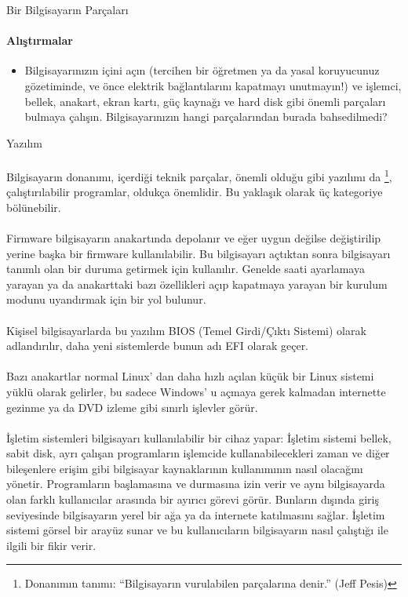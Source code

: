 \documentclass[10pt,a5paper]{book}
\begin{document}
\begin{section}{Bir Bilgisayarın Parçaları}
\paragraph{Alıştırmalar}{}
\begin{itemize}
 \item Bilgisayarınızın içini açın (tercihen bir öğretmen ya da yasal koruyucunuz gözetiminde, ve önce elektrik bağlantılarını kapatmayı unutmayın!) ve işlemci, bellek, anakart, ekran kartı, güç kaynağı ve hard disk gibi önemli parçaları bulmaya çalışın. Bilgisayarınızın hangi parçalarından burada bahsedilmedi?
\end{itemize}
\end{section}

\begin{section}{Yazılım}
\paragraph{}{Bilgisayarın donanımı, içerdiği teknik parçalar, önemli olduğu gibi yazılımı da
\footnote{Donanımın tanımı: “Bilgisayarın vurulabilen parçalarına denir.” (Jeff Pesis)}, çalıştırılabilir programlar, oldukça önemlidir. Bu yaklaşık olarak üç kategoriye bölünebilir.}
\paragraph{}{Firmware bilgisayarın anakartında depolanır ve eğer uygun değilse değiştirilip yerine başka bir firmware kullanılabilir. Bu bilgisayarı açtıktan sonra bilgisayarı tanımlı olan bir duruma getirmek için kullanılır. Genelde saati ayarlamaya yarayan ya da anakarttaki bazı özellikleri açıp kapatmaya yarayan bir kurulum modunu uyandırmak için bir yol bulunur.}
\paragraph{}{Kişisel bilgisayarlarda bu yazılım BIOS (Temel Girdi/Çıktı Sistemi) olarak adlandırılır, daha yeni sistemlerde bunun adı EFI olarak geçer.}
\paragraph{}{Bazı anakartlar normal Linux' dan daha hızlı açılan küçük bir Linux sistemi yüklü olarak gelirler, bu sadece Windows' u açmaya gerek kalmadan internette gezinme ya da DVD izleme gibi sınırlı işlevler görür.}
\paragraph{}{İşletim sistemleri bilgisayarı kullanılabilir bir cihaz yapar: İşletim sistemi bellek, sabit disk, ayrı çalışan programların işlemcide kullanabilecekleri zaman ve diğer bileşenlere erişim gibi bilgisayar kaynaklarının kullanımının nasıl olacağını yönetir. Programların başlamasına ve durmasına izin verir ve aynı bilgisayarda olan farklı kullanıcılar arasında bir ayırıcı görevi görür. Bunların dışında giriş seviyesinde bilgisayarın yerel bir ağa ya da internete katılmasını sağlar. İşletim sistemi görsel bir arayüz sunar ve bu kullanıcıların bilgisayarın nasıl çalıştığı ile ilgili bir fikir verir.}

\end{section}
\end{document}
